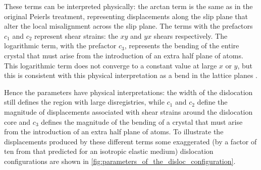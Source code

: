 These terms can be interpreted physically: the arctan term is the same as in the original Peierls treatment, representing displacements along the slip plane that alter the local misalignment across the slip plane. The terms with the prefactors $c_1$ and $c_2$ represent shear strains: the $xy$ and $yx$ shears respectively. The logarithmic term, with the prefactor $c_3$, represents the bending of the entire crystal that must arise from the introduction of an extra half plane of atoms. This logarithmic term does not converge to a constant value at large $x$ or $y$, but this is consistent with this physical interpretation as a bend in the lattice planes \cite{hirth_lothe1982peierls_displacements}.

Hence the parameters have physical interpretations: the width of the dislocation still defines the region with large disregistries, while $c_1$ and $c_2$ define the magnitude of displacements associated with shear strains around the dislocation core and $c_3$ defines the magnitude of the bending of a crystal that must arise from the introduction of an extra half plane of atoms.
To illustrate the displacements produced by these different terms some exaggerated (by a factor of ten from that predicted for an isotropic elastic medium) dislocation configurations are shown in \autoref{fig:parameters_of_the_disloc_configuration}.




